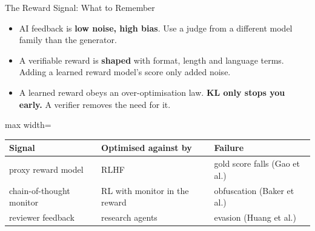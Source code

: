 \begin{frame}{The Reward Signal: What to Remember}
    \begin{itemize}\itemsep0.4em
        \item AI feedback is \textbf{low noise, high bias}. Use a judge from a different model family than the generator.
        \item A verifiable reward is \textbf{shaped} with format, length and language terms. Adding a learned reward model's score only added noise.
        \item A learned reward obeys an over-optimisation law. \textbf{KL only stops you early.} A verifier removes the need for it.
    \end{itemize}
    \vspace{0.3em}
    \begin{center}
    \small
    \begin{adjustbox}{max width=\linewidth}\begin{tabular}{lll}
        \toprule
        \textbf{Signal} & \textbf{Optimised against by} & \textbf{Failure} \\
        \midrule
        proxy reward model & RLHF & gold score falls (Gao et al.) \\
        chain-of-thought monitor & RL with monitor in the reward & obfuscation (Baker et al.) \\
        reviewer feedback & research agents & evasion (Huang et al.) \\
        \bottomrule
    \end{tabular}\end{adjustbox}
    \end{center}
\end{frame}
